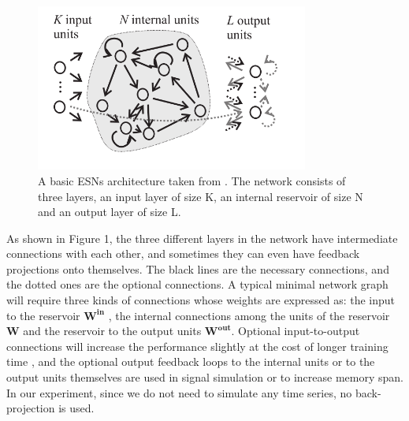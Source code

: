 \documentclass[a4paper,11pt,oneside]{article}
\begin{document}
\begin{figure}[h]
	\centering
	\includegraphics[width=0.8\textwidth]{img/esnG}
	\caption{A basic ESNs architecture taken from \cite{jaeger2001echo}. The network consists
	of three layers, an input layer of size K, an internal reservoir of size N and an output layer of size L.}
\end{figure}

As shown in Figure 1, the three different layers in the network have intermediate connections with each other, and sometimes they can even have feedback projections onto themselves. The black lines are the necessary connections, and the dotted ones are the optional connections. A typical minimal network graph will require three kinds of connections whose weights are expressed as: the input to the reservoir $\mathbf{W^{in}}$ , the internal connections among the units of the reservoir $\mathbf{W}$ and the reservoir to the output units $\mathbf{W^{out}}$. Optional input-to-output connections will increase the performance slightly at the cost of longer training time \cite{davidverstraeten2009}, and the optional output feedback loops to the internal units or to the output units themselves are used in signal simulation or to increase memory span\cite{maass2007computational}. In our experiment, since we do not need to simulate any time series, no back-projection is used.
\end{document}
